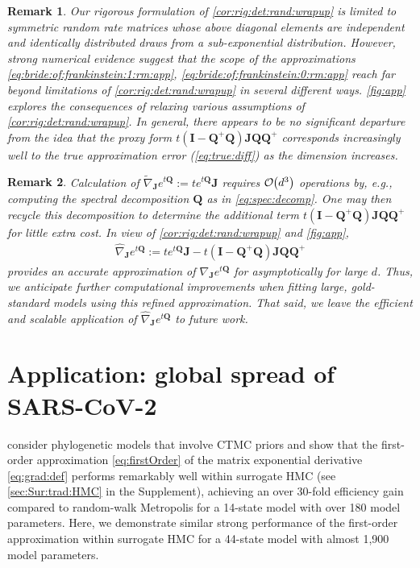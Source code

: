 \documentclass[9pt,twocolumn,twoside]{pnas-new}
\makeatletter
\newcommand{\order}[1]{{\cal O}\hspace{-0.2em}\left( #1 \right)}
\newcommand{\?}{\textbf{?}}
\newcommand{\QQ}{\mathbf{Q}}
\newcommand{\JJ}{\mathbf{J}}
\newcommand{\II}{\mathbf{I}}
\newtheorem{@remark}{\bf Remark}
\newenvironment{remark}{\begin{@remark}\rm}{\end{@remark}}
\makeatother
\begin{document}
\begin{remark}\label{rmk:non:sym:num:ev}
  Our rigorous formulation of \cref{cor:rig:det:rand:wrapup} is
  limited to symmetric random rate matrices whose above diagonal
  elements are independent and identically distributed draws from a
  sub-exponential distribution. However, strong numerical evidence
  suggest that the scope of the approximations
  \eqref{eq:bride:of:frankinstein:1:rm:app},
  \eqref{eq:bride:of:frankinstein:0:rm:app} reach far beyond
  limitations of \cref{cor:rig:det:rand:wrapup} in several different
  ways. \cref{fig:app} explores the
  consequences of relaxing various assumptions of
  \cref{cor:rig:det:rand:wrapup}. In general, there appears to be no
  significant departure from the idea that the proxy form
  $t(\II -\QQ^+ \QQ) \JJ \QQ \QQ^{+}$ corresponds increasingly well to
  the true approximation error (\eqref{eq:true:diff}) as the dimension
  increases.
\end{remark}

\begin{remark}\label{rmk:better:approx}
  Calculation of
  $\widetilde{\nabla}_{\JJ} e^{t\QQ} := t e^{t\QQ} \JJ$ requires
  $\order{d^3}$ operations by, e.g., computing the spectral
  decomposition $\QQ$ as in \eqref{eq:spec:decomp}.  One may then recycle this
  decomposition to determine the
  additional term $t(\II -\QQ^+ \QQ) \JJ \QQ \QQ^{+}$ for little extra cost.  In view of
  \cref{cor:rig:det:rand:wrapup} and \cref{fig:app},
  \begin{align}\label{eq:better:help:on:sale}
    \widehat{\nabla}_{\JJ} e^{t\QQ} := t e^{t\QQ} \JJ
    -t(\II -\QQ^+ \QQ) \JJ \QQ \QQ^{+}
  \end{align}
  provides an accurate approximation of $\nabla_{\JJ} e^{t\QQ}$ for
  asymptotically for large $d$. Thus, we anticipate further computational improvements when fitting
  large, gold-standard models using this
  refined approximation.  That said, we leave the efficient and scalable application of $\widehat{\nabla}_{\JJ} e^{t\QQ}$ to future work.
\end{remark}

\section{Application: global spread of SARS-CoV-2}
\label{sec:sars:cov:app}



\cite{magee2023random} consider phylogenetic models that involve CTMC
priors and show that the first-order approximation
\eqref{eq:firstOrder} of the matrix exponential derivative
\eqref{eq:grad:def} performs remarkably well within surrogate HMC (see
\cref{sec:Sur:trad:HMC} in the Supplement), achieving an over 30-fold
efficiency gain compared to random-walk Metropolis for a 14-state
model with over 180 model parameters.  Here, we demonstrate similar
strong performance of the first-order approximation within surrogate
HMC for a 44-state model with almost 1,900 model parameters.
\end{document}
